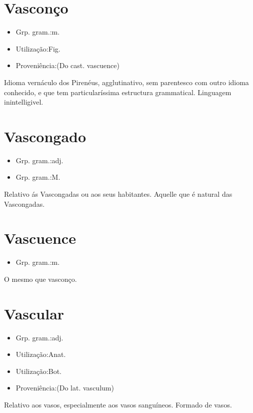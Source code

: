 \documentclass{article}
\begin{document}
\section{Vasconço}
\begin{itemize}
\item {Grp. gram.:m.}
\end{itemize}
\begin{itemize}
\item {Utilização:Fig.}
\end{itemize}
\begin{itemize}
\item {Proveniência:(Do cast. \textunderscore vascuence\textunderscore )}
\end{itemize}
Idioma vernáculo dos Pirenéus, agglutinativo, sem parentesco com outro idioma conhecido, e que tem particularíssima estructura grammatical.
Linguagem inintelligivel.
\section{Vascongado}
\begin{itemize}
\item {Grp. gram.:adj.}
\end{itemize}
\begin{itemize}
\item {Grp. gram.:M.}
\end{itemize}
Relativo ás Vascongadas ou aos seus habitantes.
Aquelle que é natural das Vascongadas.
\section{Vascuence}
\begin{itemize}
\item {Grp. gram.:m.}
\end{itemize}
O mesmo que \textunderscore vasconço\textunderscore .
\section{Vascular}
\begin{itemize}
\item {Grp. gram.:adj.}
\end{itemize}
\begin{itemize}
\item {Utilização:Anat.}
\end{itemize}
\begin{itemize}
\item {Utilização:Bot.}
\end{itemize}
\begin{itemize}
\item {Proveniência:(Do lat. \textunderscore vasculum\textunderscore )}
\end{itemize}
Relativo aos vasos, especialmente aos vasos sanguíneos.
Formado de vasos.
\end{document}
